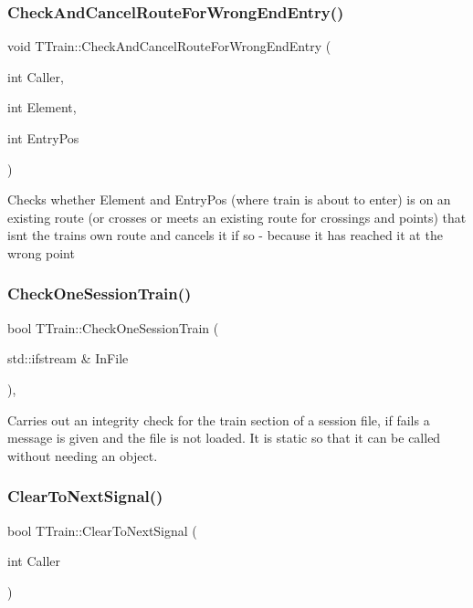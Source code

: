 \subsubsection{\texorpdfstring{Check\+And\+Cancel\+Route\+For\+Wrong\+End\+Entry()}{CheckAndCancelRouteForWrongEndEntry()}}
{\footnotesize\ttfamily void T\+Train\+::\+Check\+And\+Cancel\+Route\+For\+Wrong\+End\+Entry (\begin{DoxyParamCaption}\item[{int}]{Caller,  }\item[{int}]{Element,  }\item[{int}]{Entry\+Pos }\end{DoxyParamCaption})\hspace{0.3cm}{\ttfamily [private]}}

Checks whether Element and Entry\+Pos (where train is about to enter) is on an existing route (or crosses or meets an existing route for crossings and points) that isn\textquotesingle{}t the train\textquotesingle{}s own route and cancels it if so -\/ because it has reached it at the wrong point \mbox{\label{class_t_train_aad716bab6f8f4aa6dd49f35130d28dd9}} 
\subsubsection{\texorpdfstring{Check\+One\+Session\+Train()}{CheckOneSessionTrain()}}
{\footnotesize\ttfamily bool T\+Train\+::\+Check\+One\+Session\+Train (\begin{DoxyParamCaption}\item[{std\+::ifstream \&}]{In\+File }\end{DoxyParamCaption})\hspace{0.3cm}{\ttfamily [static]}, {\ttfamily [private]}}

Carries out an integrity check for the train section of a session file, if fails a message is given and the file is not loaded. It is static so that it can be called without needing an object. \mbox{\label{class_t_train_aeed1f50d8a4f76d7d77991d276758570}} 
\subsubsection{\texorpdfstring{Clear\+To\+Next\+Signal()}{ClearToNextSignal()}}
{\footnotesize\ttfamily bool T\+Train\+::\+Clear\+To\+Next\+Signal (\begin{DoxyParamCaption}\item[{int}]{Caller }\end{DoxyParamCaption})\hspace{0.3cm}{\ttfamily [private]}}

